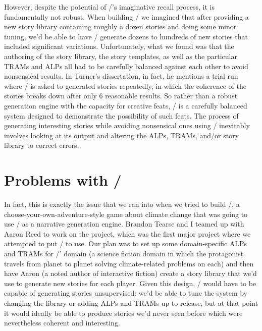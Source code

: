 However, despite the potential of \minstrel/'s imaginative recall process, it is fundamentally not robust.
%
When building \skald/ we imagined that after providing a new story library containing roughly a dozen stories and doing some minor tuning, we'd be able to have \skald/ generate dozens to hundreds of new stories that included significant variations.
%
Unfortunately, what we found was that the authoring of the story library, the story templates, as well as the particular TRAMs and ALPs all had to be carefully balanced against each other to avoid nonsensical results.
%
In Turner's dissertation, in fact, he mentions a trial run where \minstrel/ is asked to generated stories repeatedly, in which the coherence of the stories breaks down after only 6 reasonable results.
%
So rather than a robust generation engine with the capacity for creative feats, \minstrel/ is a carefully balanced system designed to demonstrate the possibility of such feats.
%
The process of generating interesting stories while avoiding nonsensical ones using \minstrel/ inevitably involves looking at its output and altering the ALPs, TRAMs, and/or story library to correct errors.


\section{Problems with \problemplanets/}

\label{sct:problem-planets-problems}

In fact, this is exactly the issue that we ran into when we tried to build \problemplanets/, a choose-your-own-adventure-style game about climate change that was going to use \skald/ as a narrative generation engine.
%
Brandon Tearse and I teamed up with Aaron Reed to work on the project, which was the first major project where we attempted to put \skald/ to use.
%
Our plan was to set up some domain-specific ALPs and TRAMs for \problemplanets/' domain (a science fiction domain in which the protagonist travels from planet to planet solving climate-related problems on each) and then have Aaron (a noted author of interactive fiction) create a story library that we'd use to generate new stories for each player.
%
Given this design, \skald/ would have to be capable of generating stories unsupervised: we'd be able to tune the system by changing the library or adding ALPs and TRAMs up to release, but at that point it would ideally be able to produce stories we'd never seen before which were nevertheless coherent and interesting.


